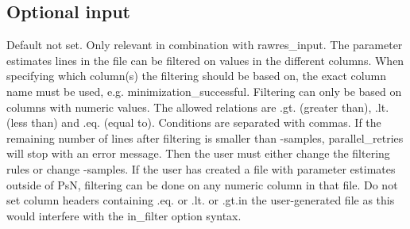 \subsection{Optional input}
\begin{optionlist}
Default not set. Only relevant in combination with rawres\_input. The parameter estimates lines in the file can be filtered on values in the different columns. When specifying which column(s) the filtering should be based on, the exact column name must be used, e.g. minimization\_successful. Filtering can only be based on columns with numeric values. The allowed relations are .gt. (greater than), .lt. (less than) and .eq. (equal to). Conditions are separated with commas. If the remaining number of lines after filtering is smaller than -samples, parallel\_retries will stop with an error message. Then the user must either change the filtering rules or change -samples. If the user has created a file with parameter estimates outside of PsN, filtering can be done on any numeric column in that file. Do not set column headers containing .eq. or .lt. or .gt.in the user-generated file as this would interfere with the in\_filter option syntax.


\end{optionlist}
